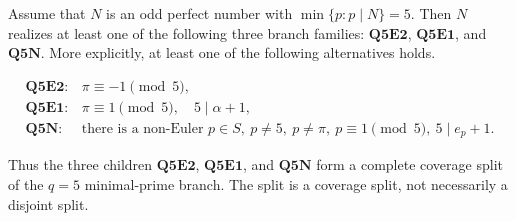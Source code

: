 \begin{proposition}[Completeness of the first \(q=5\) coverage split]
\label{prop:q5-first-input-three-child-coverage}
Assume that \(N\) is an odd perfect number with \(\min\{p:p\mid N\}=5\).
Then \(N\) realizes at least one of the following three branch families:
\(\mathbf{Q5E2}\), \(\mathbf{Q5E1}\), and \(\mathbf{Q5N}\).
More explicitly, at least one of the following alternatives holds.

\[
\begin{array}{ll}
\mathbf{Q5E2}: & \pi\equiv-1\pmod5,\\[2pt]
\mathbf{Q5E1}: & \pi\equiv1\pmod5,\quad 5\mid\alpha+1,\\[2pt]
\mathbf{Q5N}: &
\text{there is a non-Euler }p\in S,\ p\ne5,\ p\ne\pi,\ 
p\equiv1\pmod5,\ 5\mid e_p+1.
\end{array}
\]

Thus the three children \(\mathbf{Q5E2}\), \(\mathbf{Q5E1}\), and
\(\mathbf{Q5N}\) form a complete coverage split of the \(q=5\) minimal-prime
branch.  The split is a coverage split, not necessarily a disjoint split.
\end{proposition}

